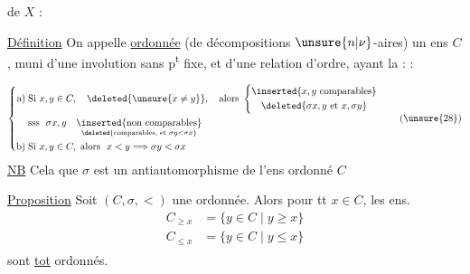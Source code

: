  de $X$ :

\uline{Définition} On appelle \uline{  ordonnée} (de décompositions $\unsure{n|\nu}$-aires) un ens   $C$, muni d'une involution \inserted{$\unsure{\sigma}$} sans p\textsuperscript{t} fixe, et d'une relation d'ordre, ayant la :   :



  

\[
\left\{
\begin{aligned}
\text{a)}\;&\text{Si }x,y\in C,\quad\deleted{\unsure{x\ne y}},\quad\text{alors }\left\{
\begin{gathered}
\inserted{x,y\text{ comparables}}\\
\deleted{\sigma x,y\text{ et }x,\sigma y}
\end{gathered}\right.\\
&\text{sss }\ \sigma x,y\quad
\underset{\deleted{\text{comparables, et }\sigma y<\sigma x}}{\inserted{\text{non comparables}}}\\
\text{b)}\;&\text{Si }x,y\in C,\ \text{alors }\ x<y\Longrightarrow\sigma y<\sigma x
\end{aligned}\right.
\tag*{(\unsure{28})}
\]
\uline{NB} Cela  que $\sigma$ est un antiautomorphisme de l'ens ordonné $C$

\endgroup

\clearpage

\noindent\makebox[0pt][r]{\rule[-1.4ex]{.4pt}{3.7ex}\hspace{.5em}}\uline{Proposition} Soit $(C,\sigma,<)$ une  ordonnée. Alors pour tt $x\in C$, les  ens.
\[
\begin{aligned}
 C_{\geq x}&=\{y\in C\mid y\geq x\}\\
 C_{\leq x}&=\{y\in C\mid y\leq x\}
\end{aligned}
\]
\makebox[0pt][r]{\rule[-.4ex]{.4pt}{2.4ex}\hspace{.5em}}sont \uline{tot\textsuperscript{}} ordonnés.

